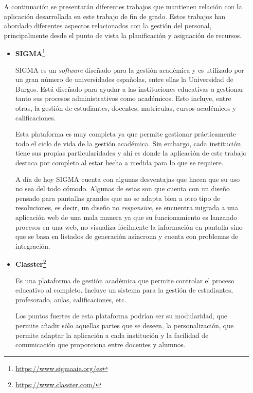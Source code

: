 
A continuación se presentarán diferentes trabajos que mantienen relación con la aplicación desarrollada en este trabajo de fin de grado.
Estos trabajos han abordado diferentes aspectos relacionados con la gestión del personal, principalmente desde el punto de vista la planificación y asignación de recursos.

\begin{itemize}
\item \textbf{SIGMA}\footnote{\url{https://www.sigmaaie.org/es}}\label{SIGMA}

SIGMA es un \textit{software} diseñado para la gestión académica y es utilizado por un gran número de universidades españolas, entre ellas la Universidad de Burgos.
Está diseñado para ayudar a las instituciones educativas a gestionar tanto sus procesos administrativos como académicos.
Esto incluye, entre otras, la gestión de estudiantes, docentes, matrículas, cursos académicos y calificaciones.

Esta plataforma es muy completa ya que permite gestionar prácticamente todo el ciclo de vida de la gestión académica. Sin embargo, cada institución tiene sus propias particularidades y ahí es donde la aplicación de este trabajo destaca por completo al estar hecha a medida para lo que se requiere.

A día de hoy SIGMA cuenta con algunas desventajas que hacen que su uso no sea del todo cómodo.
Algunas de estas son que cuenta con un diseño pensado para pantallas grandes que no se adapta bien a otro tipo de resoluciones, es decir, un diseño no \textit{responsive}, se encuentra migrada a una aplicación web de una mala manera ya que su funcionamiento es lanzando procesos en una web, no visualiza fácilmente la información en pantalla sino que se basa en listados de generación asíncrona y cuenta con problemas de integración.

\item \textbf{Classter}\footnote{\url{https://www.classter.com/}}

Es una plataforma de gestión académica que permite controlar el proceso educativo al completo.
Incluye un sistema para la gestión de estudiantes, profesorado, aulas, calificaciones, etc.

Los puntos fuertes de esta plataforma podrían ser su modularidad, que permite añadir sólo aquellas partes que se deseen, la personalización, que permite adaptar la aplicación a cada institución y la facilidad de comunicación que proporciona entre docentes y alumnos.


\end{itemize}
